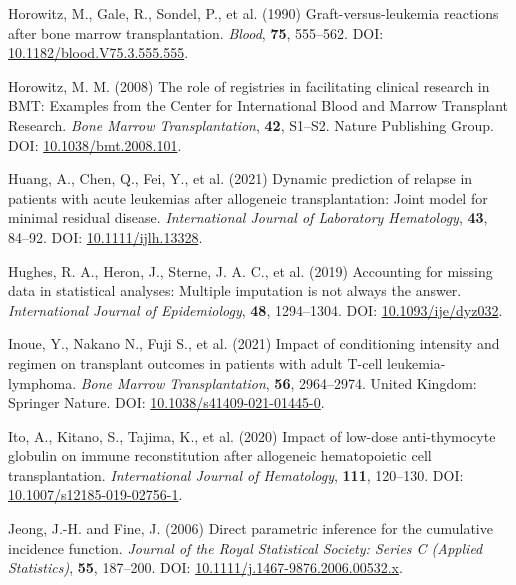 \documentclass[
  letterpaper,
  DIV=11,
  numbers=noendperiod]{scrreprt}
\newlength{\cslhangindent}
\newenvironment{CSLReferences}[2] %
 {\begin{list}{}{%
  \setlength{\itemindent}{0pt}
  \setlength{\leftmargin}{0pt}
  \setlength{\parsep}{0pt}
  \ifodd #1
   \setlength{\leftmargin}{\cslhangindent}
   \setlength{\itemindent}{-1\cslhangindent}
  \fi
  \setlength{\itemsep}{#2\baselineskip}}}
 {\end{list}}
\begin{document}
\begin{CSLReferences}{1}{1}
Horowitz, M., Gale, R., Sondel, P., et al. (1990) Graft-versus-leukemia
reactions after bone marrow transplantation. \emph{Blood}, \textbf{75},
555--562. DOI:
\href{https://doi.org/10.1182/blood.V75.3.555.555}{10.1182/blood.V75.3.555.555}.

Horowitz, M. M. (2008) The role of registries in facilitating clinical
research in {BMT}: Examples from the {Center} for {International Blood}
and {Marrow Transplant Research}. \emph{Bone Marrow Transplantation},
\textbf{42}, S1--S2. Nature Publishing Group. DOI:
\href{https://doi.org/10.1038/bmt.2008.101}{10.1038/bmt.2008.101}.

Huang, A., Chen, Q., Fei, Y., et al. (2021) Dynamic prediction of
relapse in patients with acute leukemias after allogeneic
transplantation: {Joint} model for minimal residual disease.
\emph{International Journal of Laboratory Hematology}, \textbf{43},
84--92. DOI:
\href{https://doi.org/10.1111/ijlh.13328}{10.1111/ijlh.13328}.

Hughes, R. A., Heron, J., Sterne, J. A. C., et al. (2019) Accounting for
missing data in statistical analyses: Multiple imputation is not always
the answer. \emph{International Journal of Epidemiology}, \textbf{48},
1294--1304. DOI:
\href{https://doi.org/10.1093/ije/dyz032}{10.1093/ije/dyz032}.

Inoue, Y., Nakano N., Fuji S., et al. (2021) Impact of conditioning
intensity and regimen on transplant outcomes in patients with adult
{T-cell} leukemia-lymphoma. \emph{Bone Marrow Transplantation},
\textbf{56}, 2964--2974. United Kingdom: Springer Nature. DOI:
\href{https://doi.org/10.1038/s41409-021-01445-0}{10.1038/s41409-021-01445-0}.

Ito, A., Kitano, S., Tajima, K., et al. (2020) Impact of low-dose
anti-thymocyte globulin on immune reconstitution after allogeneic
hematopoietic cell transplantation. \emph{International Journal of
Hematology}, \textbf{111}, 120--130. DOI:
\href{https://doi.org/10.1007/s12185-019-02756-1}{10.1007/s12185-019-02756-1}.

Jeong, J.-H. and Fine, J. (2006) Direct parametric inference for the
cumulative incidence function. \emph{Journal of the Royal Statistical
Society: Series C (Applied Statistics)}, \textbf{55}, 187--200. DOI:
\href{https://doi.org/10.1111/j.1467-9876.2006.00532.x}{10.1111/j.1467-9876.2006.00532.x}.


\end{CSLReferences}
\end{document}
